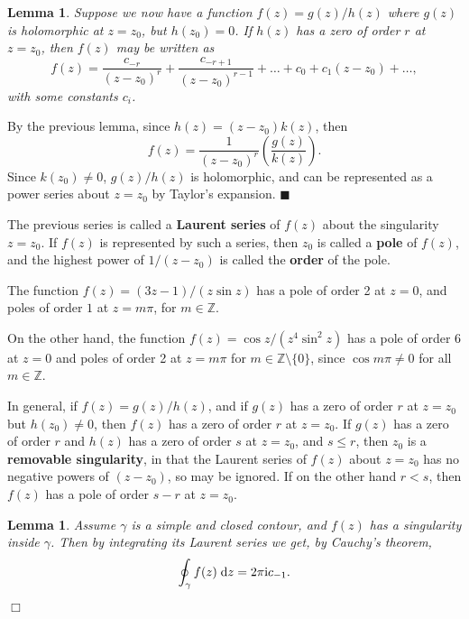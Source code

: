 \documentclass[letter-paper]{tufte-book}
\newtheorem{lemma}[theorem]{\color{pastel-blue}Lemma}
\newenvironment{proof}[1][Proof]{\begin{trivlist}
\item[\hskip \labelsep {\bfseries #1}]}{\end{trivlist}}
\newenvironment{example}[1][Example]{\begin{trivlist}
\item[\hskip \labelsep {\bfseries #1}]}{\end{trivlist}}
\newcommand{\zi}{{\rm i}}
\newcommand\Def[1]{\textbf{#1}}
\newcommand{\qed}{\hfill$\blacksquare$}
\newcommand{\qedwhite}{\hfill \ensuremath{\Box}}
\begin{document}
\begin{lemma}
  Suppose we now have a function $f(z) = g(z) / h(z)$ where $g(z)$ is
  holomorphic at $z=z_0$, but $h(z_0) = 0$. If $h(z)$ has a zero of order $r$ at
  $z=z_0$, then $f(z)$ may be written as
  \begin{equation*}
    f(z) = \frac{c_{-r}}{(z-z_0)^r} + \frac{c_{-r+1}}{(z-z_0)^{r-1}} + \ldots + c_0 + c_1 (z-z_0) + \ldots,
  \end{equation*}
  with some constants $c_i$.
\end{lemma}

\begin{proof}
  By the previous lemma, since $h(z) = (z-z_0) k(z)$, then
  \begin{equation}
    f(z) = \frac{1}{(z-z_0)^r}\left(\frac{g(z)}{k(z)}\right).
  \end{equation}
  Since $k(z_0) \neq 0$, $g(z) / h(z)$ is holomorphic, and can be represented as
  a power series about $z=z_0$ by Taylor's expansion. \qed
\end{proof}

The previous series is called a \Def{Laurent series} of $f(z)$ about the
singularity $z=z_0$. If $f(z)$ is represented by such a series, then $z_0$ is
called a \Def{pole} of $f(z)$, and the highest power of $1/(z-z_0)$ is called
the \Def{order} of the pole.

\begin{example}
  The function $f(z) = (3z-1) / (z \sin z)$ has a pole of order 2 at $z=0$, and
  poles of order $1$ at $z = m\pi$, for $m \in \mathbb{Z}$.
  
  On the other hand, the function $f(z) = \cos z / (z^4 \sin^2 z)$ has a pole of
  order 6 at $z=0$ and poles of order 2 at $z=m\pi$ for $m \in \mathbb{Z}
  \setminus \{0\}$, since $\cos m\pi \neq 0$ for all $m \in \mathbb{Z}$.
\end{example}

In general, if $f(z) = g(z) / h(z)$, and if $g(z)$ has a zero of order $r$ at
$z=z_0$ but $h(z_0) \neq 0$, then $f(z)$ has a zero of order $r$ at $z=z_0$. If
$g(z)$ has a zero of order $r$ and $h(z)$ has a zero of order $s$ at $z=z_0$,
and $s \leq r$, then $z_0$ is a \Def{removable singularity}, in that the Laurent
series of $f(z)$ about $z=z_0$ has no negative powers of $(z-z_0)$, so may be
ignored. If on the other hand $r < s$, then $f(z)$ has a pole of order $s-r$ at
$z=z_0$.

\begin{lemma}
  Assume $\gamma$ is a simple and closed contour, and $f(z)$ has a singularity
  inside $\gamma$. Then by integrating its Laurent series we get, by Cauchy's
  theorem,
  \begin{equation*}
    \oint_\gamma f(z)\; \mathrm{d}z = 2\pi\zi c_{-1}.
  \end{equation*}
   \qedwhite
\end{lemma}
\end{document}
